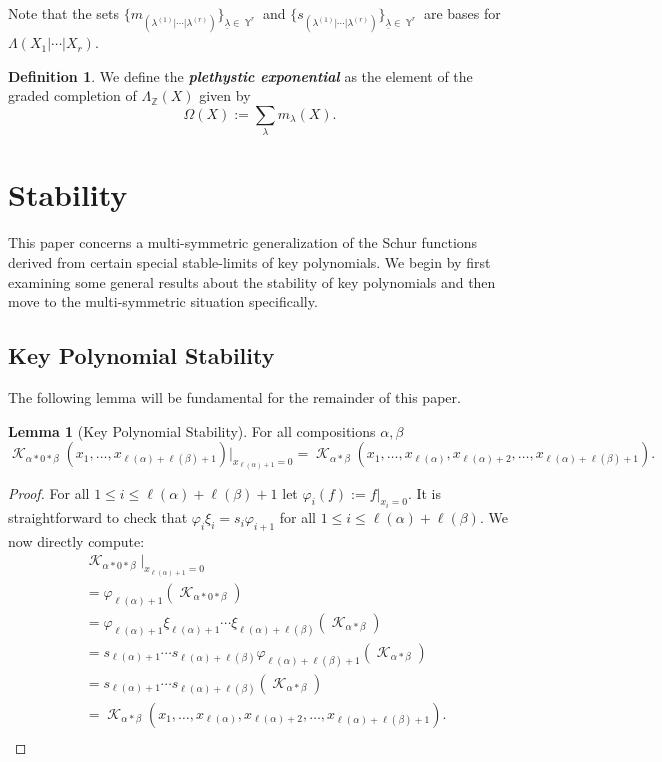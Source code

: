 \documentclass[12pt,reqno]{amsart}
\theoremstyle{definition}
\newtheorem{lem}[thm]{Lemma}
\newtheorem{defn}[thm]{Definition}
\DeclareMathOperator{\Par}{\mathbb{Y}}
\DeclareMathOperator{\cK}{\mathcal{K}}
\begin{document}
Note that the sets $\{m_{(\lambda^{(1)}|\cdots|\lambda^{(r)})}\}_{\underline{\lambda} \in \Par^r}$ and $\{s_{(\lambda^{(1)}|\cdots|\lambda^{(r)})}\}_{\underline{\lambda} \in \Par^r}$ are bases for $\Lambda(X_1|\cdots|X_r).$

\begin{defn}
    We define the \textbf{\textit{plethystic exponential}} as the element of the graded completion of $\Lambda_{\mathbb{Z}}(X)$ given by 
    $$\Omega(X):= \sum_{\lambda} m_{\lambda}(X).$$   
\end{defn}


\section{Stability}

This paper concerns a multi-symmetric generalization of the Schur functions derived from certain special stable-limits of key polynomials. We begin by first examining some general results about the stability of key polynomials and then move to the multi-symmetric situation specifically.


\subsection{Key Polynomial Stability}


The following lemma will be fundamental for the remainder of this paper.

\begin{lem}[Key Polynomial Stability]\label{stability lemma}
    For all compositions $\alpha,\beta$
    $$\cK_{\alpha*0*\beta}(x_1,\ldots, x_{\ell(\alpha)+\ell(\beta)+1})|_{x_{\ell(\alpha)+1}=0} = \cK_{\alpha*\beta}(x_1,\ldots, x_{\ell(\alpha)},x_{\ell(\alpha)+2},\ldots,x_{\ell(\alpha)+\ell(\beta)+1}).$$
\end{lem}
\begin{proof}
    For all $1\leq i \leq \ell(\alpha)+\ell(\beta)+1$ let $\varphi_i(f):= f|_{x_i=0}.$ It is straightforward to check that $\varphi_i\xi_i = s_i \varphi_{i+1}$ for all $1\leq i \leq \ell(\alpha)+\ell(\beta).$ We now directly compute: 
    \begin{align*}
        &\cK_{\alpha*0*\beta}|_{x_{\ell(\alpha)+1}=0} \\
        &= \varphi_{\ell(\alpha)+1} \left( \cK_{\alpha*0*\beta} \right)\\
        &= \varphi_{\ell(\alpha)+1}\xi_{\ell(\alpha)+1}\cdots \xi_{\ell(\alpha)+\ell(\beta)}(\cK_{\alpha*\beta})\\
        &= s_{\ell(\alpha)+1}\cdots s_{\ell(\alpha)+\ell(\beta)} \varphi_{\ell(\alpha)+\ell(\beta)+1}(\cK_{\alpha*\beta})\\
        &= s_{\ell(\alpha)+1}\cdots s_{\ell(\alpha)+\ell(\beta)}(\cK_{\alpha*\beta})\\
        &= \cK_{\alpha*\beta}(x_1,\ldots, x_{\ell(\alpha)},x_{\ell(\alpha)+2},\ldots,x_{\ell(\alpha)+\ell(\beta)+1}).\\
    \end{align*}
\end{proof}
\end{document}
